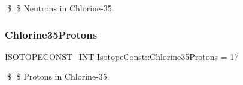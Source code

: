 \$ \$ Neutrons in Chlorine-\/35. \mbox{\label{group___isotope_const-_chlorine-_cl35_ga92b51e18b8001c873103694470a33d4a}} 
\subsubsection{\texorpdfstring{Chlorine35\+Protons}{Chlorine35Protons}}
{\footnotesize\ttfamily \mbox{\hyperlink{group___isotope_const-_macros_ga5f18360b3e99483a35c32d789e62621c}{I\+S\+O\+T\+O\+P\+E\+C\+O\+N\+S\+T\+\_\+\+I\+NT}} Isotope\+Const\+::\+Chlorine35\+Protons = 17}

\$ \$ Protons in Chlorine-\/35. 